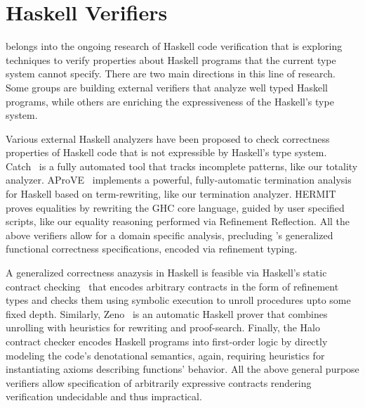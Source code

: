 \section{Haskell Verifiers}\label{related:haskell}

\toolname belongs into the ongoing research of Haskell code verification
that is exploring techniques to verify properties about Haskell programs
that the current type system cannot specify. 
%
There are two main directions in this line of research. 
%
Some groups are building external verifiers that analyze 
well typed Haskell programs, while others are enriching 
the expressiveness of the Haskell's type system. 

Various external Haskell analyzers have been proposed 
to check correctness properties of Haskell code that 
is not expressible by Haskell's type system. 
%
Catch~\cite{catch} is
a fully automated tool that tracks incomplete patterns,
like our totality analyzer. 
AProVE~\cite{Giesl11} implements a powerful, fully-automatic
termination analysis for Haskell based on term-rewriting,
like our termination analyzer. 
HERMIT~\citep{Farmer15} proves equalities by rewriting
the GHC core language, guided by user specified scripts, 
like our equality reasoning performed via Refinement Reflection.
%
All the above verifiers allow for a domain specific analysis, 
precluding \toolname's generalized functional 
correctness specifications, encoded via refinement typing. 
%

A generalized correctness anazysis in Haskell is feasible 
via Haskell's static contract checking~\cite{XuPOPL09} 
that encodes arbitrary contracts in the form of refinement types and
checks them using symbolic execution to unroll procedures
upto some fixed depth.
%
Similarly, Zeno~\cite{ZENO} is an automatic Haskell 
prover that combines unrolling with heuristics for rewriting
and proof-search. 
%
Finally, the Halo~\cite{halo} contract checker encodes 
Haskell programs into first-order logic by directly 
modeling the code's denotational semantics,
again, requiring heuristics for instantiating axioms 
describing functions' behavior.
%
All the above general purpose verifiers 
allow specification of arbitrarily expressive contracts
rendering verification undecidable and thus impractical. 


 
 
